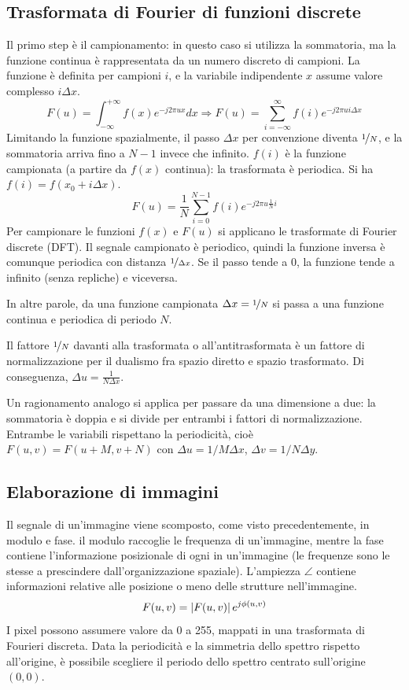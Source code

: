 \subsection{Trasformata di Fourier di funzioni discrete}
Il primo step è il campionamento: in questo caso si utilizza la sommatoria, ma la funzione continua è rappresentata da un numero discreto di campioni. La funzione è definita per campioni $i$, e la variabile indipendente $x$ assume valore complesso $i\Delta x$.
$$F(u) = \int_{-\infty}^{+\infty} f(x)e^{-j2\pi ux} dx \Longrightarrow F(u) = \sum_{i=-\infty}^{\infty} f(i)e^{-j2\pi ui\Delta x}$$
Limitando la funzione spazialmente, il passo $\Delta x$ per convenzione diventa $\nicefrac{1}{N}$, e la sommatoria arriva fino a $N - 1$ invece che infinito. $f(i)$ è la funzione campionata (a partire da $f(x)$ continua): la trasformata è periodica. Si ha $f(i) = f(x_0 + i\Delta x)$.
$$F(u) = \frac{1}{N} \sum_{i=0}^{N-1} f(i)e^{-j2\pi u \frac{1}{N}i}$$
Per campionare le funzioni $f(x)$ e $F(u)$ si applicano le trasformate di Fourier discrete (DFT). Il segnale campionato è periodico, quindi la funzione inversa è comunque periodica con distanza $\nicefrac{1}{\Delta x}$. Se il passo tende a 0, la funzione tende a infinito (senza repliche) e viceversa. 

In altre parole, da una funzione campionata $\Delta x = \nicefrac{1}{N}$ si passa a una funzione continua e periodica di periodo $N$. 

Il fattore $\nicefrac{1}{N}$ davanti alla trasformata o all'antitrasformata è un fattore di normalizzazione per il dualismo fra spazio diretto e spazio trasformato. Di conseguenza, $\Delta u = \frac{1}{N\Delta x}$.

Un ragionamento analogo si applica per passare da una dimensione a due: la sommatoria è doppia e si divide per entrambi i fattori di normalizzazione. Entrambe le variabili rispettano la periodicità, cioè $F(u, v) = F(u + M, v + N)$ con $\Delta u = 1/M \Delta x$, $\Delta v = 1/N \Delta y$.

\subsection{Elaborazione di immagini}
Il segnale di un'immagine viene scomposto, come visto precedentemente, in modulo e fase. il modulo raccoglie le frequenza di un'immagine, mentre la fase contiene l'informazione posizionale di ogni in un'immagine (le frequenze sono le stesse a prescindere dall'organizzazione spaziale). L'ampiezza $\angle$ contiene informazioni relative alle posizione o meno delle strutture nell'immagine.
$$F(u, v) = \left|F(u, v)\right|e^{j\phi(u, v)}$$
I pixel possono assumere valore da 0 a 255, mappati in una trasformata di Fourieri discreta. Data la periodicità e la simmetria dello spettro rispetto all'origine, è possibile scegliere il periodo dello spettro centrato sull'origine $(0, 0)$.


